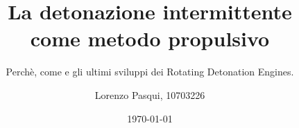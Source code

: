 \documentclass{beamer}
\title{La detonazione intermittente \\come metodo propulsivo}
\subtitle{Perchè, come e gli ultimi sviluppi dei Rotating Detonation Engines.}
\author{Lorenzo Pasqui, 10703226}
\date{\today}
\begin{document}
\begin{frame}
    \maketitle
\end{frame}
\end{document}
